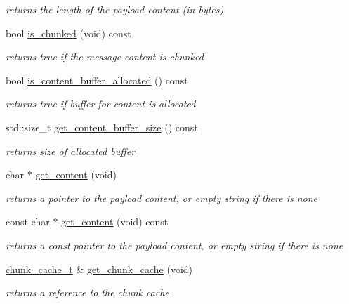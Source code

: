\begin{DoxyCompactItemize}
\begin{DoxyCompactList}\small\item\em returns the length of the payload content (in bytes) \end{DoxyCompactList}\item 
bool \hyperlink{classpion_1_1http_1_1message_a96264a238b04e1957c87ab7930a8023b}{is\-\_\-chunked} (void) const 
\begin{DoxyCompactList}\small\item\em returns true if the message content is chunked \end{DoxyCompactList}\item 
bool \hyperlink{classpion_1_1http_1_1message_a7229c3a00b35846cdb050fc2b9b6ec73}{is\-\_\-content\-\_\-buffer\-\_\-allocated} () const 
\begin{DoxyCompactList}\small\item\em returns true if buffer for content is allocated \end{DoxyCompactList}\item 
std\-::size\-\_\-t \hyperlink{classpion_1_1http_1_1message_a172346504faba36f73d7527551c199a2}{get\-\_\-content\-\_\-buffer\-\_\-size} () const 
\begin{DoxyCompactList}\small\item\em returns size of allocated buffer \end{DoxyCompactList}\item 
char $\ast$ \hyperlink{classpion_1_1http_1_1message_a60ddb1bd09afecdadc5e9c33c8c1de28}{get\-\_\-content} (void)
\begin{DoxyCompactList}\small\item\em returns a pointer to the payload content, or empty string if there is none \end{DoxyCompactList}\item 
const char $\ast$ \hyperlink{classpion_1_1http_1_1message_aa2363086d3f0c17a54ecebaef558b971}{get\-\_\-content} (void) const 
\begin{DoxyCompactList}\small\item\em returns a const pointer to the payload content, or empty string if there is none \end{DoxyCompactList}\item 
\hyperlink{classpion_1_1http_1_1message_a4bcf1ea1d4e7a5637d04ae109adb5e46}{chunk\-\_\-cache\-\_\-t} \& \hyperlink{classpion_1_1http_1_1message_aa672e8369ab07a212902a98f351805f3}{get\-\_\-chunk\-\_\-cache} (void)
\begin{DoxyCompactList}\small\item\em returns a reference to the chunk cache \end{DoxyCompactList}\item 

\end{DoxyCompactItemize}
